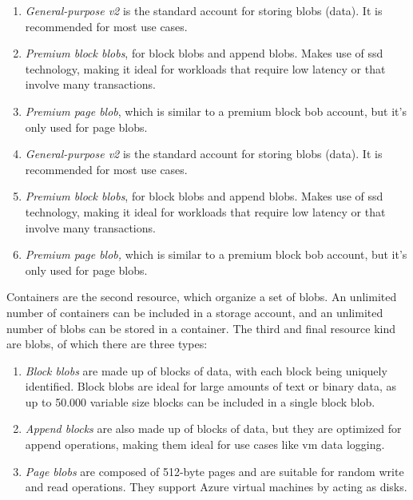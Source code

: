 \begin{enumerate}

    \item \textit{General-purpose v2} is the standard account for storing blobs (data). It is recommended for most use cases.

    \item \textit{Premium block blobs}, for block blobs and append blobs. Makes use of \ac{ssd} technology, making it ideal for workloads that require low latency or that involve many transactions.

    \item \textit{Premium page blob}, which is similar to a premium block bob account, but it's only used for page blobs.

    \item \textit{General-purpose v2} is the standard account for storing blobs (data). It is recommended for most use cases.

    \item \textit{Premium block blobs}, for block blobs and append blobs. Makes use of \ac{ssd} technology, making it ideal for workloads that require low latency or that involve many transactions.

    \item \textit{Premium page blob,} which is similar to a premium block bob account, but it's only used for page blobs.

\end{enumerate}

Containers are the second resource, which organize a set of blobs. An unlimited number of containers can be included in a storage account, and an unlimited number of blobs can be stored in a container. The third and final resource kind are blobs, of which there are three types:

\begin{enumerate}
    \item \textit{Block blobs} are made up of blocks of data, with each block being uniquely identified. Block blobs are ideal for large amounts of text or binary data, as up to 50.000 variable size blocks can be included in a single block blob.

    \item \textit{Append blocks} are also made up of blocks of data, but they are optimized for append operations, making them ideal for use cases like \ac{vm} data logging.

    \item \textit{Page blobs}  are composed of 512-byte pages and are suitable for random write and read operations. They support Azure virtual machines by acting as disks.
\end{enumerate}


